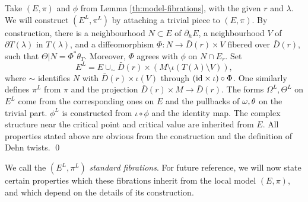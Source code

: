 \documentclass[10pt,letterpaper]{article}
\begin{document}
\proof Take $(E,\pi)$ and $\phi$ from Lemma \ref{th:model-fibrations}, with the
given $r$ and $\lambda$. We will construct $(E^L,\pi^L)$ by attaching a trivial
piece to $(E,\pi)$. By construction, there is a neighbourhood $N \subset E$ of
$\partial_hE$, a neighbourhood $V$ of $\partial T(\lambda)$ in $T(\lambda)$,
and a diffeomorphism $\Phi: N \rightarrow \bar{D}(r) \times V$ fibered over
$\bar{D}(r)$, such that $\Theta|N = \Phi^*\theta_T$. Moreover, $\Phi$ agrees
with $\phi$ on $N \cap E_r$. Set
\[
E^L = E \cup_{\sim} \bar{D}(r) \times (M \setminus \iota(T(\lambda) \setminus
V)),
\]
where $\sim$ identifies $N$ with $\bar{D}(r) \times \iota(V)$ through $(\mathrm{id}
\times \iota) \circ \Phi$. One similarly defines $\pi^L$ from $\pi$ and the
projection $\bar{D}(r) \times M \rightarrow \bar{D}(r)$. The forms
$\Omega^L,\Theta^L$ on $E^L$ come from the corresponding ones on $E$ and the
pullbacks of $\omega,\theta$ on the trivial part. $\phi^L$ is constructed from
$\iota \circ \phi$ and the identity map. The complex structure near the
critical point and critical value are inherited from $E$. All properties stated
above are obvious from the construction and the definition of Dehn twists. \qed

We call the $(E^L,\pi^L)$ {\em standard fibrations}. For future reference, we
will now state certain properties which these fibrations inherit from the local
model $(E,\pi)$, and which depend on the details of its construction.
\end{document}
